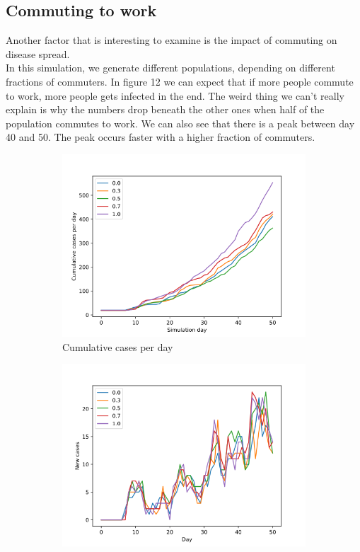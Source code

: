 \documentclass[runningheads]{llncs}
\begin{document}
\subsection{Commuting to work}
Another factor that is interesting to examine is the impact of commuting on disease spread. \\
In this simulation, we generate different populations, depending on different fractions of commuters. In figure 12 we can expect that if more people commute to work, more people gets infected in the end. The weird thing we can't really explain is why the numbers drop beneath the other ones when half of the population commutes to work. We can also see that there is a peak between day 40 and 50. The peak occurs faster with a higher fraction of commuters. 

\begin{figure}[h!]
	\centering
	\begin{subfigure}[b]{0.7\linewidth}
		\includegraphics[width=\textwidth]{population10000_Cumulative.png}
		\caption{Cumulative cases per day} 
	\end{subfigure}
	\begin{subfigure}[b]{0.7\linewidth}
		\includegraphics[width=\textwidth]{population10000_cases_per_day.png}

\end{subfigure}
\end{figure}
\end{document}
